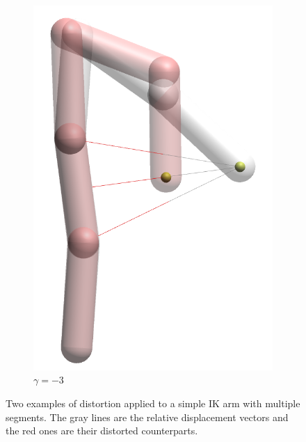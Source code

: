 \begin{figure}
\begin{subfigure}[b]{0.2\textwidth}
        \includegraphics[width=\textwidth]{Figures/simple_distortion_-3.png}
        \caption{$\gamma = -3$}
    \end{subfigure}
    \caption{Two examples of distortion applied to a simple IK arm with multiple segments. The gray lines are the relative displacement vectors and the red ones are their distorted counterparts.}\label{fig:armExamples}
\end{figure}

